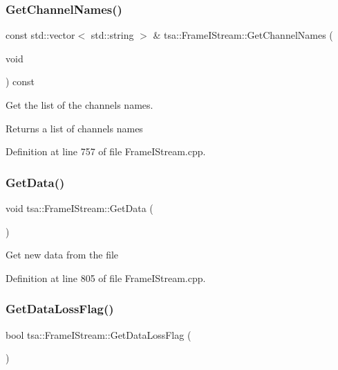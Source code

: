 \subsubsection{\texorpdfstring{Get\+Channel\+Names()}{GetChannelNames()}}
{\footnotesize\ttfamily const std\+::vector$<$ std\+::string $>$ \& tsa\+::\+Frame\+I\+Stream\+::\+Get\+Channel\+Names (\begin{DoxyParamCaption}\item[{void}]{ }\end{DoxyParamCaption}) const}

Get the list of the channel\textquotesingle{}s names.

\begin{DoxyReturn}{Returns}
a list of channel\textquotesingle{}s names 
\end{DoxyReturn}


Definition at line 757 of file Frame\+I\+Stream.\+cpp.

\mbox{\label{classtsa_1_1_frame_i_stream_a2f95f7fcf1e17f2d1b4a6b3dca976e76}} 
\subsubsection{\texorpdfstring{Get\+Data()}{GetData()}}
{\footnotesize\ttfamily void tsa\+::\+Frame\+I\+Stream\+::\+Get\+Data (\begin{DoxyParamCaption}{ }\end{DoxyParamCaption})\hspace{0.3cm}{\ttfamily [private]}}

Get new data from the file 

Definition at line 805 of file Frame\+I\+Stream.\+cpp.

\mbox{\label{classtsa_1_1_frame_i_stream_abdd07c781d107408f1b3e800e7fab42f}} 
\subsubsection{\texorpdfstring{Get\+Data\+Loss\+Flag()}{GetDataLossFlag()}}
{\footnotesize\ttfamily bool tsa\+::\+Frame\+I\+Stream\+::\+Get\+Data\+Loss\+Flag (\begin{DoxyParamCaption}{ }\end{DoxyParamCaption})\hspace{0.3cm}{\ttfamily [inline]}}

